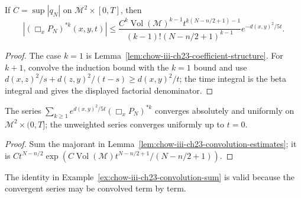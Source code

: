 \begin{lemma}
\label{lem:chow-iii-ch23-convolution-estimates}


If $C=\sup|q_N|$ on $\mathcal M^2\times[0,T]$, then
\[
|(\Box_xP_N)^{*k}(x,y,t)|\le
\frac{C^k\operatorname{Vol}(\mathcal M)^{k-1}t^{k(N-n/2+1)-1}}
 {(k-1)!(N-n/2+1)^{k-1}}e^{-d(x,y)^2/5t}.
\]
\end{lemma}
\begin{proof}
\sketch The case $k=1$ is Lemma~\ref{lem:chow-iii-ch23-coefficient-structure}.  For
$k+1$, convolve the induction bound with the $k=1$ bound and use
\(d(x,z)^2/s+d(z,y)^2/(t-s)\ge d(x,y)^2/t\); the time integral is the beta
integral and gives the displayed factorial denominator.
\end{proof}

\begin{corollary}
\label{cor:chow-iii-ch23-convolution-series}


The series $\sum_{k\ge1}e^{d(x,y)^2/5t}(\Box_xP_N)^{*k}$ converges absolutely and
uniformly on $\mathcal M^2\times(0,T]$; the unweighted series converges uniformly
up to $t=0$.
\end{corollary}
\begin{proof}
\sketch Sum the majorant in Lemma~\ref{lem:chow-iii-ch23-convolution-estimates}; it is
\(Ct^{N-n/2}\exp(C\operatorname{Vol}(\mathcal M)t^{N-n/2+1}/(N-n/2+1))\).
\end{proof}

\begin{example}
\label{ex:chow-iii-ch23-convolution-series-commutes}


The identity in Example~\ref{ex:chow-iii-ch23-convolution-sum} is valid because
the convergent series may be convolved term by term.
\end{example}

